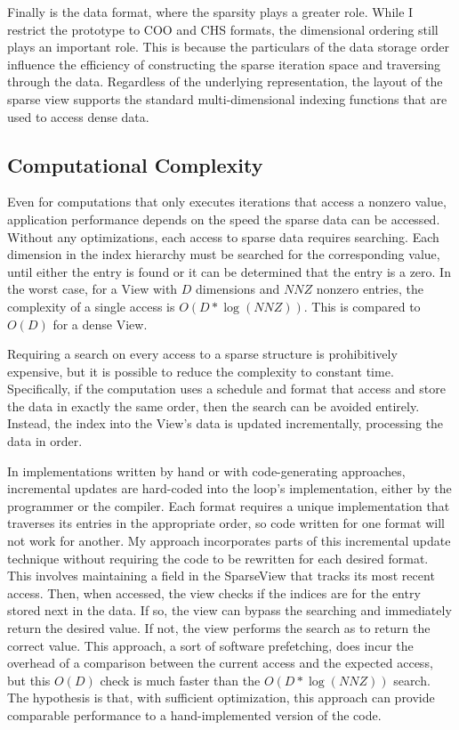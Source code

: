 Finally is the data format, where the sparsity plays a greater role.
While I restrict the prototype to COO and CHS formats, the dimensional ordering still plays an important role.
This is because the particulars of the data storage order influence the efficiency of constructing the sparse iteration space and traversing through the data.
Regardless of the underlying representation, the layout of the sparse view supports the standard multi-dimensional indexing functions that are used to access dense data.

\subsection{Computational Complexity}

Even for computations that only executes iterations that access a nonzero value, application performance depends on the speed the sparse data can be accessed.
Without any optimizations, each access to sparse data requires searching. 
Each dimension in the index hierarchy must be searched for the corresponding value, until either the entry is found or it can be determined that the entry is a zero.
In the worst case, for a View with $D$ dimensions and $NNZ$ nonzero entries, the complexity of a single access is $O(D * \log(NNZ))$. 
This is compared to $O(D)$ for a dense View.

Requiring a search on every access to a sparse structure is prohibitively expensive, but it is possible to reduce the complexity to constant time.
Specifically, if the computation uses a schedule and format that access and store the data in exactly the same order, then the search can be avoided entirely.
Instead, the index into the View's data is updated incrementally, processing the data in order.

In implementations written by hand or with code-generating approaches, incremental updates are hard-coded into the loop's implementation, either by the programmer or the compiler.
Each format requires a unique implementation that traverses its entries in the appropriate order, so code written for one format will not work for another.
My approach incorporates parts of this incremental update technique without requiring the code to be rewritten for each desired format. 
This involves maintaining a field in the SparseView that tracks its most recent access.
Then, when accessed, the view checks if the indices are for the entry stored next in the data. 
If so, the view can bypass the searching and immediately return the desired value. 
If not, the view performs the search as to return the correct value. 
This approach, a sort of software prefetching, does incur the overhead of a comparison between the current access and the expected access, but this $O(D)$ check is much faster than the $O(D*\log(NNZ))$ search.
The hypothesis is that, with sufficient optimization, this approach can provide comparable performance to a hand-implemented version of the code.

